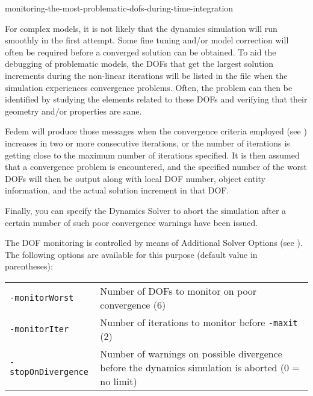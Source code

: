 {


           {monitoring-the-most-problematic-dofs-during-time-integration}

For complex models, it is not likely that the dynamics simulation will run
smoothly in the first attempt. Some fine tuning and/or model correction will
often be required before a converged solution can be obtained.
To aid the debugging of problematic models, the DOFs that get the largest
solution increments during the non-linear iterations will be listed in the
 file when the simulation experiences convergence problems.
Often, the problem can then be identified by studying the elements related
to these DOFs and verifying that their geometry and/or properties are sane.

Fedem will produce those messages when the convergence criteria employed (see
)
increases in two or more consecutive iterations, or the number of iterations is
getting close to the maximum number of iterations specified.
It is then assumed that a convergence problem is encountered, and the specified
number of the worst DOFs will then be output along with local DOF number,
object entity information, and the actual solution increment in that DOF.

Finally, you can specify the Dynamics Solver to abort the simulation
after a certain number of such poor convergence warnings have been issued.

The DOF monitoring is controlled by means of Additional Solver Options
(see ).
The following options are available for this purpose
(default value in parentheses):

\begin{tabular}{ m{3.0cm} m{8.0cm} }
{\tt-monitorWorst} & Number of DOFs to monitor on poor convergence (6) \\
{\tt-monitorIter} & Number of iterations to monitor before {\tt-maxit} (2) \\
{\tt-stopOnDivergence} & Number of warnings on possible divergence before the
                         dynamics simulation is aborted (0 = no limit)
\end{tabular}


}
